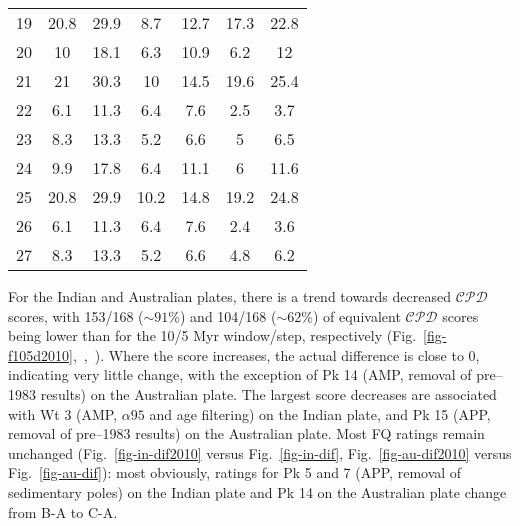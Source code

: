 \begin{table}[!ht]
{\begin{tabular}{@{}ccccccc@{}}
      19 & 20.8 & 29.9 & 8.7 & 12.7 & 17.3 & 22.8 \\
      20 & 10 & 18.1 & 6.3 & 10.9 & 6.2 & 12 \\
      21 & 21 & 30.3 & 10 & 14.5 & 19.6 & 25.4 \\
      22 & 6.1 & 11.3 & 6.4 & 7.6 & 2.5 & 3.7 \\
      23 & 8.3 & 13.3 & 5.2 & 6.6 & 5 & 6.5 \\
      24 & 9.9 & 17.8 & 6.4 & 11.1 & 6 & 11.6 \\
      25 & 20.8 & 29.9 & 10.2 & 14.8 & 19.2 & 24.8 \\
      26 & 6.1 & 11.3 & 6.4 & 7.6 & 2.4 & 3.6 \\
      27 & 8.3 & 13.3 & 5.2 & 6.6 & 4.8 & 6.2 \\ \bottomrule
    \end{tabular}%
  }
\end{table}

For the Indian and Australian plates, there is a trend towards decreased
$\mathcal{CPD}$ scores, with 153/168 (${\sim}91$\%) and 104/168 (${\sim}62$\%)
of equivalent $\mathcal{CPD}$ scores being lower than for the 10/5 Myr
window/step, respectively
(Fig.~\ref{fig-f105d2010},~,~).
Where the score increases, the actual difference is close to 0, indicating very
little change, with the exception of Pk 14 (AMP, removal of pre–1983 results) on
the Australian plate. The largest score decreases are associated with Wt 3 (AMP,
${\alpha}95$ and age filtering) on the Indian plate, and Pk 15 (APP, removal of
pre–1983 results) on the Australian plate. Most FQ ratings remain unchanged
(Fig.~\ref{fig-in-dif2010} versus Fig.~\ref{fig-in-dif},
Fig.~\ref{fig-au-dif2010} versus Fig.~\ref{fig-au-dif}): most obviously, ratings
for Pk 5 and 7 (APP, removal of sedimentary poles) on the Indian plate and Pk 14
on the Australian plate change from B-A to C-A.

